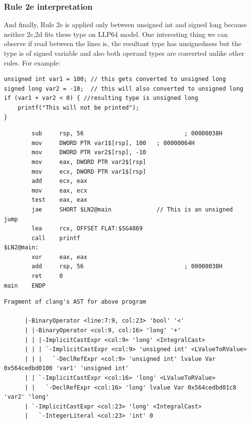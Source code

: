 \documentclass{article}
\begin{document}
\subsubsection{Rule 2e interpretation}
And finally, Rule 2e is applied only between unsigned int and signed long
because neither 2c,2d fits these type on LLP64 model. One interesting thing we
can observe if read between the lines is, the resultant type has unsignedness
but the type is of signed variable and also both operand types are converted
unlike other rules.
For example:
\begin{verbatim}
unsigned int var1 = 100; // this gets converted to unsigned long
signed long var2 = -10;  // this will also converted to unsigned long
if (var1 + var2 < 0) { //resulting type is unsigned long
    printf("This will not be printed");
}
\end{verbatim}
\begin{verbatim}
        sub     rsp, 56                             ; 00000038H
        mov     DWORD PTR var1$[rsp], 100   ; 00000064H
        mov     DWORD PTR var2$[rsp], -10
        mov     eax, DWORD PTR var2$[rsp]
        mov     ecx, DWORD PTR var1$[rsp]
        add     ecx, eax
        mov     eax, ecx
        test    eax, eax
        jae     SHORT $LN2@main             // This is an unsigned jump
        lea     rcx, OFFSET FLAT:$SG4869
        call    printf
$LN2@main:
        xor     eax, eax
        add     rsp, 56                             ; 00000038H
        ret     0
main    ENDP
\end{verbatim}
\begin{verbatim}
Fragment of clang's AST for above program

      |-BinaryOperator <line:7:9, col:23> 'bool' '<'
      | |-BinaryOperator <col:9, col:16> 'long' '+'
      | | |-ImplicitCastExpr <col:9> 'long' <IntegralCast>
      | | | `-ImplicitCastExpr <col:9> 'unsigned int' <LValueToRValue>
      | | |   `-DeclRefExpr <col:9> 'unsigned int' lvalue Var 0x564cedbd0100 'var1' 'unsigned int'
      | | `-ImplicitCastExpr <col:16> 'long' <LValueToRValue>
      | |   `-DeclRefExpr <col:16> 'long' lvalue Var 0x564cedbd01c8 'var2' 'long'
      | `-ImplicitCastExpr <col:23> 'long' <IntegralCast>
      |   `-IntegerLiteral <col:23> 'int' 0
\end{verbatim}
\end{document}
